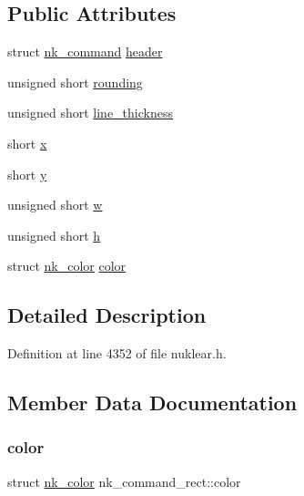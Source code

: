 \subsection*{Public Attributes}
\begin{DoxyCompactItemize}
\item 
struct \mbox{\hyperlink{structnk__command}{nk\+\_\+command}} \mbox{\hyperlink{structnk__command__rect_af226093def19264b5fe9ca10beee0858}{header}}
\item 
unsigned short \mbox{\hyperlink{structnk__command__rect_a577dba663ae1e3f6c91b9cb9a515f0aa}{rounding}}
\item 
unsigned short \mbox{\hyperlink{structnk__command__rect_a6261e370240fb8d33f54d1e69e5a628c}{line\+\_\+thickness}}
\item 
short \mbox{\hyperlink{structnk__command__rect_af6a275761f7d8eef83312ddb18f1fd9a}{x}}
\item 
short \mbox{\hyperlink{structnk__command__rect_a15646d8a746934d4748a9761b9b9a6e6}{y}}
\item 
unsigned short \mbox{\hyperlink{structnk__command__rect_a4f1ab19724e091adb07766db30aef2a3}{w}}
\item 
unsigned short \mbox{\hyperlink{structnk__command__rect_a430ba7f3274d6746f3ffaf2d92b26b83}{h}}
\item 
struct \mbox{\hyperlink{structnk__color}{nk\+\_\+color}} \mbox{\hyperlink{structnk__command__rect_a459f754c3020184bee8e866ce280b219}{color}}
\end{DoxyCompactItemize}


\subsection{Detailed Description}


Definition at line 4352 of file nuklear.\+h.



\subsection{Member Data Documentation}
\mbox{\label{structnk__command__rect_a459f754c3020184bee8e866ce280b219}} 
\subsubsection{\texorpdfstring{color}{color}}
{\footnotesize\ttfamily struct \mbox{\hyperlink{structnk__color}{nk\+\_\+color}} nk\+\_\+command\+\_\+rect\+::color}



